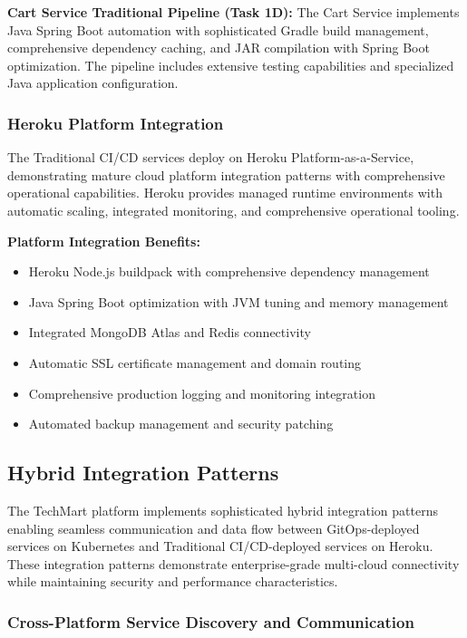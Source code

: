 \textbf{Cart Service Traditional Pipeline (Task 1D):}
The Cart Service implements Java Spring Boot automation with sophisticated Gradle build management, comprehensive dependency caching, and JAR compilation with Spring Boot optimization. The pipeline includes extensive testing capabilities and specialized Java application configuration.

\subsubsection{Heroku Platform Integration}

The Traditional CI/CD services deploy on Heroku Platform-as-a-Service, demonstrating mature cloud platform integration patterns with comprehensive operational capabilities. Heroku provides managed runtime environments with automatic scaling, integrated monitoring, and comprehensive operational tooling.

\textbf{Platform Integration Benefits:}
\begin{itemize}
\item Heroku Node.js buildpack with comprehensive dependency management
\item Java Spring Boot optimization with JVM tuning and memory management
\item Integrated MongoDB Atlas and Redis connectivity
\item Automatic SSL certificate management and domain routing
\item Comprehensive production logging and monitoring integration
\item Automated backup management and security patching
\end{itemize}

\subsection{Hybrid Integration Patterns}

The TechMart platform implements sophisticated hybrid integration patterns enabling seamless communication and data flow between GitOps-deployed services on Kubernetes and Traditional CI/CD-deployed services on Heroku. These integration patterns demonstrate enterprise-grade multi-cloud connectivity while maintaining security and performance characteristics.

\subsubsection{Cross-Platform Service Discovery and Communication}

